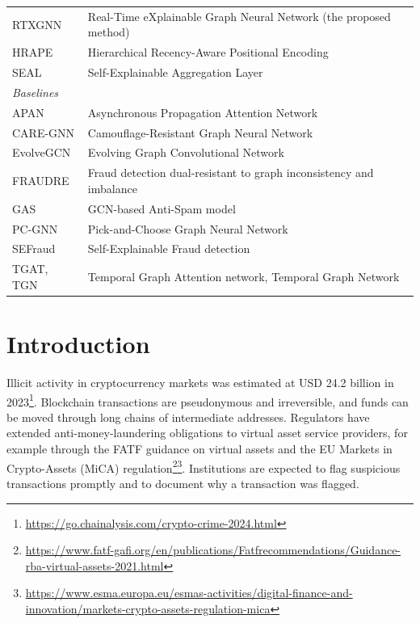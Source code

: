 \begin{center}
\begin{longtable}{lp{}}
RTXGNN    & Real-Time eXplainable Graph Neural Network (the proposed method) \\
HRAPE     & Hierarchical Recency-Aware Positional Encoding \\
SEAL      & Self-Explainable Aggregation Layer \\
\hline
\multicolumn{2}{l}{\textit{Baselines}} \\
APAN      & Asynchronous Propagation Attention Network \\
CARE-GNN  & Camouflage-Resistant Graph Neural Network \\
EvolveGCN & Evolving Graph Convolutional Network \\
FRAUDRE   & Fraud detection dual-resistant to graph inconsistency and imbalance \\
GAS       & GCN-based Anti-Spam model \\
PC-GNN    & Pick-and-Choose Graph Neural Network \\
SEFraud   & Self-Explainable Fraud detection \\
TGAT, TGN & Temporal Graph Attention network, Temporal Graph Network \\
\end{longtable}
\end{center}

\section{Introduction}

Illicit activity in cryptocurrency markets was estimated at USD 24.2 billion in 2023\footnote{\url{https://go.chainalysis.com/crypto-crime-2024.html}}. Blockchain transactions are pseudonymous and irreversible, and funds can be moved through long chains of intermediate addresses. Regulators have extended anti-money-laundering obligations to virtual asset service providers, for example through the FATF guidance on virtual assets and the EU Markets in Crypto-Assets (MiCA) regulation\footnote{\url{https://www.fatf-gafi.org/en/publications/Fatfrecommendations/Guidance-rba-virtual-assets-2021.html}}\footnote{\url{https://www.esma.europa.eu/esmas-activities/digital-finance-and-innovation/markets-crypto-assets-regulation-mica}}. Institutions are expected to flag suspicious transactions promptly and to document why a transaction was flagged.

